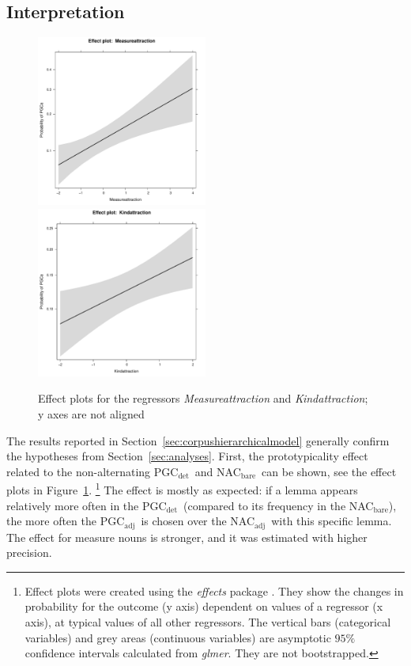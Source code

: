 \documentclass[USenglish]{article}
\newcommand{\Sub}[1]{\ensuremath{\mathrm{_{#1}}}}
\newcommand{\NACb}{NAC\Sub{bare}}
\newcommand{\NACa}{NAC\Sub{adj}}
\newcommand{\PGCd}{PGC\Sub{det}}
\newcommand{\PGCa}{PGC\Sub{adj}}
\begin{document}


\subsection{Interpretation}
\label{sec:interpretation}


\begin{figure}[h!]
  \centering
  \includegraphics[width=0.5\textwidth]{../R/output/corpus_Measureattraction}~\includegraphics[width=0.5\textwidth]{../R/output/corpus_Kindattraction}
  \caption{Effect plots for the regressors \textit{Measureattraction} and \textit{Kindattraction}; y axes are not aligned}
  \label{fig:eff:attraction}
\end{figure}

The results reported in Section~\ref{sec:corpushierarchicalmodel} generally confirm the hypotheses from Section~\ref{sec:analyses}.
First, the prototypicality effect related to the non-alternating \PGCd\ and \NACb\ can be shown, see the effect plots in Figure~\ref{fig:eff:attraction}.%
\footnote{Effect plots were created using the \textit{effects} package \citep{Fox2003}.
They show the changes in probability for the outcome (y axis) dependent on values of a regressor (x axis), at typical values of all other regressors.
The vertical bars (categorical variables) and grey areas (continuous variables) are asymptotic $95\%$ confidence intervals calculated from \textit{glmer}.
They are not bootstrapped.}
The effect is mostly as expected:
if a lemma appears relatively more often in the \PGCd\ (compared to its frequency in the \NACb), the more often the \PGCa\ is chosen over the \NACa\ with this specific lemma.
The effect for measure nouns is stronger, and it was estimated with higher precision.
\end{document}
